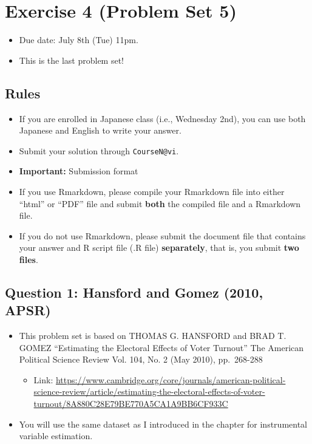 \documentclass[]{book}
\providecommand{\tightlist}{%
  \setlength{\itemsep}{0pt}\setlength{\parskip}{0pt}}
\begin{document}
\chapter{Exercise 4 (Problem Set 5)}\label{exercise-4-problem-set-5}

\begin{itemize}
\tightlist
\item
  Due date: July 8th (Tue) 11pm.
\item
  This is the last problem set!
\end{itemize}

\section{Rules}\label{rules-2}

\begin{itemize}
\tightlist
\item
  If you are enrolled in Japanese class (i.e., Wednesday 2nd), you can
  use both Japanese and English to write your answer.
\item
  Submit your solution through \texttt{CourseN@vi}.
\item
  \textbf{Important:} Submission format
\item
  If you use Rmarkdown, please compile your Rmarkdown file into either
  ``html'' or ``PDF'' file and submit \textbf{both} the compiled file
  and a Rmarkdown file.
\item
  If you do not use Rmarkdown, please submit the document file that
  contains your answer and R script file (.R file) \textbf{separately},
  that is, you submit \textbf{two files}.
\end{itemize}

\section{Question 1: Hansford and Gomez (2010,
APSR)}\label{question-1-hansford-and-gomez-2010-apsr}

\begin{itemize}
\tightlist
\item
  This problem set is based on THOMAS G. HANSFORD and BRAD T. GOMEZ
  ``Estimating the Electoral Effects of Voter Turnout'' The American
  Political Science Review Vol. 104, No. 2 (May 2010), pp.~268-288

  \begin{itemize}
  \tightlist
  \item
    Link:
    \url{https://www.cambridge.org/core/journals/american-political-science-review/article/estimating-the-electoral-effects-of-voter-turnout/8A880C28E79BE770A5CA1A9BB6CF933C}
  \end{itemize}
\item
  You will use the same dataset as I introduced in the chapter for
  instrumental variable estimation.
\end{itemize}
\end{document}
